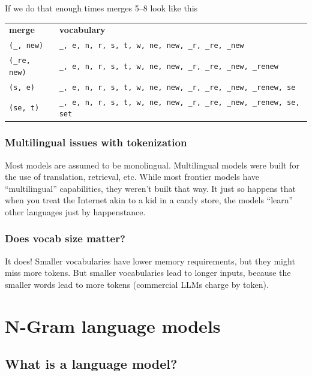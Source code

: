\documentclass[11pt]{article}
\begin{document}
If we do that enough times merges 5--8 look like this

\begin{center}
	\begin{tabular}{ll}
		\textbf{merge}       & \textbf{vocabulary}                                                        \\
		\texttt{(\_, new)}   & \texttt{\_, e, n, r, s, t, w, ne, new, \_r, \_re, \_new}                   \\
		\texttt{(\_re, new)} & \texttt{\_, e, n, r, s, t, w, ne, new, \_r, \_re, \_new, \_renew}          \\
		\texttt{(s, e)}      & \texttt{\_, e, n, r, s, t, w, ne, new, \_r, \_re, \_new, \_renew, se}      \\
		\texttt{(se, t)}     & \texttt{\_, e, n, r, s, t, w, ne, new, \_r, \_re, \_new, \_renew, se, set} \\
	\end{tabular}
\end{center}




\subsubsection{Multilingual issues with tokenization}

Most models are assumed to be monolingual. Multilingual models were built for
the use of translation, retrieval, etc. While most frontier models have
``multilingual'' capabilities, they weren't built that way. It just so happens
that when you treat the Internet akin to a kid in a candy store, the models
``learn'' other languages just by happenstance.

\subsubsection{Does vocab size matter?}

It does! Smaller vocabularies have lower memory requirements, but they might
miss more tokens. But smaller vocabularies lead to longer inputs, because the
smaller words lead to more tokens (commercial LLMs charge by token).

\section{N-Gram language models}

\subsection{What is a language model?}
\end{document}
